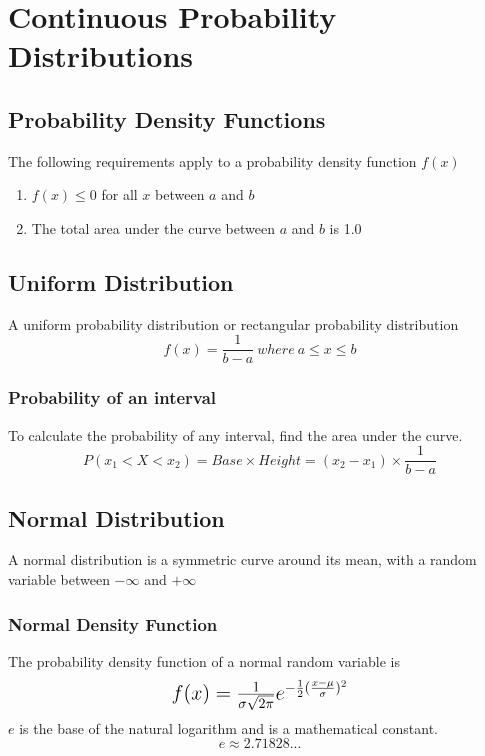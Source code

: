 \documentclass{article}
\begin{document}
\section{Continuous Probability Distributions}

\subsection{Probability Density Functions}
The following requirements apply to a probability density function $f(x)$
\begin{enumerate}
\item $f(x) \leq 0$ for all $x$ between $a$ and $b$
\item The total area under the curve between $a$ and $b$ is 1.0
\end{enumerate}

\subsection{Uniform Distribution}
A uniform probability distribution or rectangular probability distribution
$$
f(x) = \frac{1}{b - a}\:where\:a \leq x \leq b
$$

\subsubsection{Probability of an interval}
To calculate the probability of any interval, find the area under the curve.
$$
P(x_1 < X < x_2) =  Base \times Height = (x_2 - x_1) \times \frac{1}{b - a}
$$

\subsection{Normal Distribution}
A normal distribution is a symmetric curve around its mean, with a random variable between $-\infty$ and $+\infty$

\subsubsection{Normal Density Function}
The probability density function of a normal random variable is
\begin{equation}
\mbox{\Large\( 
f(x) = \frac{1}{\sigma\sqrt{2\pi}}e^{-\frac{1}{2}(\frac{x-\mu}{\sigma})^2}
\)}
\end{equation}
$e$ is the base of the natural logarithm and is a mathematical constant.
$$e \approx 2.71828...$$
\end{document}
